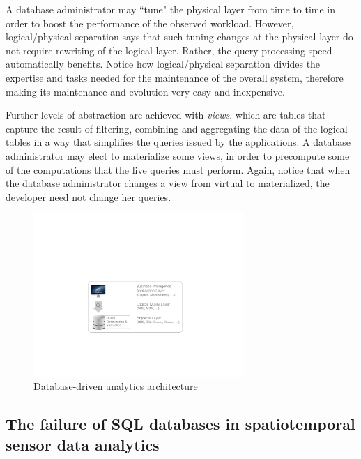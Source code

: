 A database administrator may ``tune" the physical layer from time to time in order to boost the performance of the observed workload. However, logical/physical separation says that such tuning changes at the physical layer do not require rewriting of the logical layer. Rather, the query processing speed automatically benefits. Notice how logical/physical separation divides the expertise and tasks needed for the maintenance of the overall system, therefore making its maintenance and evolution very easy and inexpensive.

Further levels of abstraction are achieved with {\em views}, which are tables that capture the result of filtering, combining and aggregating the data of the logical tables in a way that simplifies the queries issued by the applications. A database administrator may elect to materialize some views, in order to precompute some of the computations that the live queries must perform. Again, notice that when the database administrator changes a view from virtual to materialized, the developer need not change her queries.

\begin{figure}
\center
\includegraphics[width=8cm]{fig-dbms.pdf}
\caption{Database-driven analytics architecture}
\label{fig:db-driven-arch}
\vspace*{-0.5cm}
\end{figure}

\subsection{The failure of SQL databases in spatiotemporal sensor data analytics}
\label{sec:the-failure}

